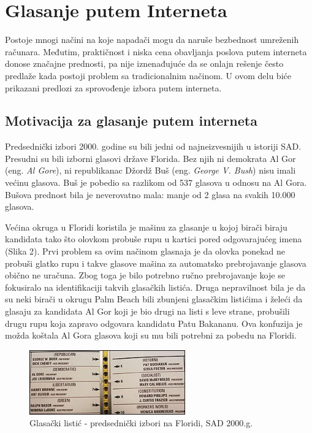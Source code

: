 \documentclass[a4paper]{article}
\theoremstyle{break}
\begin{document}
{\section{Glasanje putem Interneta}
\label{sec:glasanje}

Postoje mnogi načini na koje napadači mogu da naruše bezbednost umreženih računara. Međutim, praktičnost i niska cena obavljanja poslova putem interneta donose značajne prednosti, pa nije iznenađujuće da se onlajn rešenje često predlaže kada postoji problem sa tradicionalnim načinom. U ovom delu biće prikazani predlozi za sprovođenje izbora putem interneta.

\subsection{Motivacija za glasanje putem interneta}
\label{subsec:Motivacija za glasanje putem interneta}

Predsednički izbori 2000. godine su bili jedni od najneizvesnijih u istoriji SAD. Presudni su bili izborni glasovi države Florida. Bez njih ni demokrata Al Gor (eng. {\em Al Gore}), ni republikanac Džordž Buš (eng. {\em George V. Bush}) nisu imali većinu glasova. Buš je pobedio sa razlikom od 537 glasova u odnosu na Al Gora. Bušova prednost bila je neverovatno mala: manje od 2 glasa na svakih 10.000 glasova.

Većina okruga u Floridi koristila je mašinu za glasanje u kojoj birači biraju kandidata tako što olovkom probuše rupu u kartici pored odgovarajućeg imena (Slika 2). Prvi problem sa ovim načinom glasnaja je da olovka ponekad ne probuši glatko rupu i takve glasove mašina za automatsko prebrojavanje glasova obično ne uračuna. Zbog toga je bilo potrebno ručno prebrojavanje koje se fokusiralo na identifikaciji takvih glasačkih listića. Druga nepravilnost bila je da su neki birači u okrugu Palm Beach bili zbunjeni glasačkim listićima i želeći da glasaju za kandidata Al Gor koji je bio drugi na listi s leve strane, probušili drugu rupu koja zapravo odgovara kandidatu Patu Bakananu. Ova konfuzija je možda koštala Al Gora glasova koji su mu bili potrebni za pobedu na Floridi.
\begin{figure}[h!]
\begin{center}
\includegraphics[width=0.6\textwidth]{butterfly_ballot.jpg}
\end{center}
\caption{Glasački listić - predsednički izbori na Floridi, SAD 2000.g.}
\label{fig:butterfly_ballot}
\end{figure}

}
\end{document}
